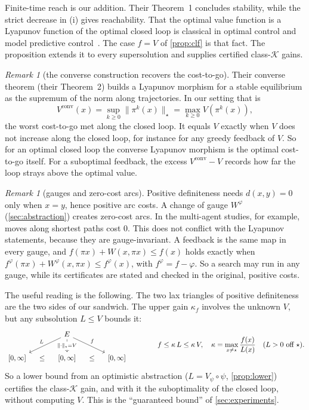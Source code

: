 \documentclass[11pt]{article}
\theoremstyle{definition}
\theoremstyle{remark}
\newtheorem{remark}[theorem]{Remark}
\newcommand{\dd}{d}
\newcommand{\tgt}{\star}
\begin{document}
Finite-time reach is our addition. Their Theorem~1 concludes stability, while the
strict decrease in (i) gives reachability. That the optimal value function is a
Lyapunov function of the optimal closed loop is classical in optimal control and
model predictive control~\cite{bertsekas2017,rawlings2017}. The case $f = V$ of
\cref{prop:clf} is that fact. The proposition extends it to every supersolution
and supplies certified class-$\mathcal K$ gains.

\begin{remark}[the converse construction recovers the cost-to-go]\label{rem:converse}
Their converse theorem (their Theorem~2) builds a Lyapunov morphism for a stable
equilibrium as the supremum of the norm along trajectories. In our setting that is
\[
V^{\mathrm{conv}}(x) = \sup_{k \ge 0} \|\pi^k(x)\|_\tgt = \max_{k \ge 0} V(\pi^k(x)),
\]
the worst cost-to-go met along the closed loop. It equals $V$ exactly when $V$ does
not increase along the closed loop, for instance for any greedy feedback of $V$. So
for an optimal closed loop the converse Lyapunov morphism is the optimal cost-to-go
itself. For a suboptimal feedback, the excess $V^{\mathrm{conv}} - V$ records how far
the loop strays above the optimal value.
\end{remark}

\begin{remark}[gauges and zero-cost arcs]\label{rem:gauge-lyap}
Positive definiteness needs $\dd(x,y) = 0$ only when $x = y$, hence positive arc
costs. A change of gauge $W^\varphi$ (\cref{sec:abstraction}) creates zero-cost
arcs. In the multi-agent studies, for example, moves along shortest paths cost $0$.
This does not conflict with the Lyapunov statements, because they are
gauge-invariant. A feedback is the same map in every gauge, and
$f(\pi x) + W(x,\pi x) \le f(x)$ holds exactly when
$f^\varphi(\pi x) + W^\varphi(x,\pi x) \le f^\varphi(x)$, with
$f^\varphi = f - \varphi$. So a search may run in any gauge, while its certificates
are stated and checked in the original, positive costs.
\end{remark}

The useful reading is the following. The two lax triangles of positive
definiteness are the two sides of our sandwich. The upper gain $\kappa_f$ involves
the unknown $V$, but any subsolution $L \le V$ bounds it:
\[
\begin{tikzcd}[column sep=large]
& E \arrow[dl, "L"'] \arrow[d, "\|\cdot\|_\tgt = V" description] \arrow[dr, "f"] & \\
{[0,\infty]} \arrow[r, phantom, "\le"] & {[0,\infty]} \arrow[r, phantom, "\le"] & {[0,\infty]}
\end{tikzcd}
\qquad\qquad
f \le \kappa\, L \le \kappa\, V, \quad \kappa = \max_{x \ne \tgt} \frac{f(x)}{L(x)}
\quad (L > 0 \text{ off } \tgt).
\]
So a lower bound from an optimistic abstraction ($L = V_\psi \circ \psi$,
\cref{prop:lower}) certifies the class-$\mathcal K$ gain, and with it the
suboptimality of the closed loop, without computing $V$. This is the
``guaranteed bound'' of \cref{sec:experiments}.
\end{document}
